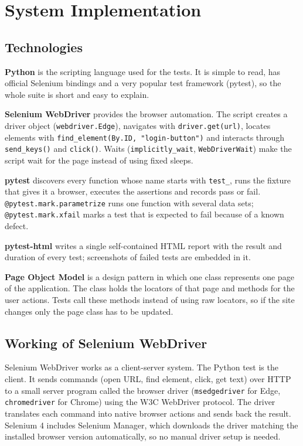 \documentclass[12pt,a4paper]{article}
\begin{document}
\section{System Implementation}\label{sec:impl}
\subsection{Technologies}\label{sec:impl1}
\textbf{Python} is the scripting language used for the tests. It is simple to read, has official Selenium bindings and a very popular test framework (pytest), so the whole suite is short and easy to explain.

\textbf{Selenium WebDriver} provides the browser automation. The script creates a driver object (\texttt{webdriver.Edge}), navigates with \texttt{driver.get(url)}, locates elements with \texttt{find\_element(By.ID, "login-button")} and interacts through \texttt{send\_keys()} and \texttt{click()}. Waits (\texttt{implicitly\_wait}, \texttt{WebDriverWait}) make the script wait for the page instead of using fixed sleeps.

\textbf{pytest} discovers every function whose name starts with \texttt{test\_}, runs the fixture that gives it a browser, executes the assertions and records pass or fail. \texttt{@pytest.mark.parametrize} runs one function with several data sets; \texttt{@pytest.mark.xfail} marks a test that is expected to fail because of a known defect.

\textbf{pytest-html} writes a single self-contained HTML report with the result and duration of every test; screenshots of failed tests are embedded in it.

\textbf{Page Object Model} is a design pattern in which one class represents one page of the application. The class holds the locators of that page and methods for the user actions. Tests call these methods instead of using raw locators, so if the site changes only the page class has to be updated.

\subsection{Working of Selenium WebDriver}\label{sec:impl2}
Selenium WebDriver works as a client-server system. The Python test is the client. It sends commands (open URL, find element, click, get text) over HTTP to a small server program called the browser driver (\texttt{msedgedriver} for Edge, \texttt{chromedriver} for Chrome) using the W3C WebDriver protocol. The driver translates each command into native browser actions and sends back the result. Selenium 4 includes Selenium Manager, which downloads the driver matching the installed browser version automatically, so no manual driver setup is needed.
\end{document}
